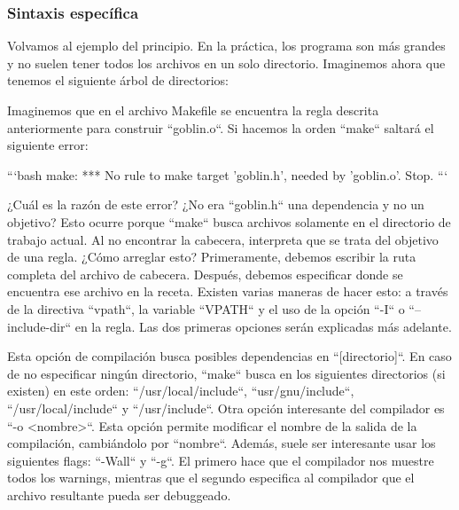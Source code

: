 \documentclass[11pt,twoside,titlepage,a4paper]{article}
\theoremstyle{definition}
\theoremstyle{plain_rojo}
\theoremstyle{remark}
\begin{document}
\subsubsection{Sintaxis específica}

Volvamos al ejemplo del principio. En la práctica, los programa son más grandes y no suelen tener todos los archivos en un solo directorio. Imaginemos ahora que tenemos el siguiente árbol de directorios:


Imaginemos que en el archivo Makefile se encuentra la regla descrita anteriormente para construir ``goblin.o``. Si hacemos la orden ``make`` saltará el siguiente error:

```bash
make: *** No rule to make target 'goblin.h', needed by 'goblin.o'.  Stop.
```

¿Cuál es la razón de este error? ¿No era ``goblin.h`` una dependencia y no un objetivo? Esto ocurre porque ``make`` busca archivos solamente en el directorio de trabajo actual. Al no encontrar la cabecera, interpreta que se trata del objetivo de una regla. ¿Cómo arreglar esto? Primeramente, debemos escribir la ruta completa del archivo de cabecera. Después, debemos especificar donde se encuentra ese archivo en la receta. Existen varias maneras de hacer esto: a través de la directiva ``vpath``, la variable ``VPATH`` y el uso de la opción ``-I`` o ``--include-dir`` en la regla. Las dos primeras opciones serán explicadas más adelante.

Esta opción de compilación busca posibles dependencias en  ``[directorio]``. En caso de no especificar ningún directorio, ``make`` busca en los siguientes directorios (si existen) en este orden: ``/usr/local/include``, ``usr/gnu/include``, ``/usr/local/include`` y ``/usr/include``. Otra opción interesante del compilador es ``-o <nombre>``. Esta opción permite modificar el nombre de la salida de la compilación, cambiándolo por ``nombre``. Además, suele ser interesante usar los siguientes flags: ``-Wall`` y ``-g``. El primero hace que el compilador nos muestre todos los warnings, mientras que el segundo especifica al compilador que el archivo resultante pueda ser debuggeado.
\end{document}
